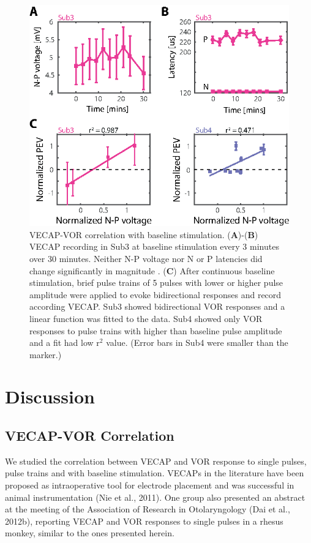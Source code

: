\begin{figure}[btp]
\centering
\includegraphics{chapters/partI/vecapvor/figures/Fig_vecapvor_baseline2.eps} 
\caption[VECAP-VOR correlation with baseline stimulation]{VECAP-VOR correlation with baseline stimulation. (\textbf{A})-(\textbf{B}) VECAP recording in Sub3 at baseline stimulation every 3 minutes over 30 minutes. Neither N-P voltage nor N or P latencies did change significantly in magnitude . (\textbf{C}) After continuous baseline stimulation, brief pulse trains of 5 pulses with lower or higher pulse amplitude were applied to evoke bidirectional responses and record according VECAP. Sub3 showed bidirectional VOR responses and a linear function was fitted to the data. Sub4 showed only VOR responses to pulse trains with higher than baseline pulse amplitude and a fit had low r$^2$ value. (Error bars in Sub4 were smaller than the marker.)}
\label{fig:vecapvor:baseline}
\end{figure}

\section{Discussion}
\subsection{VECAP-VOR Correlation}
We studied the correlation between VECAP and VOR response to single pulses, pulse trains and with baseline stimulation. VECAPs in the literature have been proposed as intraoperative tool for electrode placement and was successful in animal instrumentation (Nie et al., 2011). One group also presented an abstract at the meeting of the Association of Research in Otolaryngology (Dai et al., 2012b), reporting VECAP and VOR responses to single pulses in a rhesus monkey, similar to the ones presented herein.

